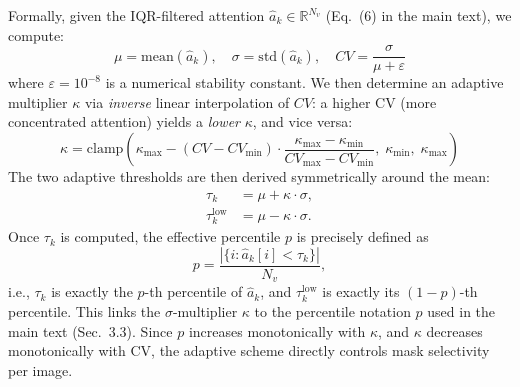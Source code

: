 Formally, given the IQR-filtered attention $\hat{a}_k \in \mathbb{R}^{N_v}$ (Eq.~(6) in the main text), we compute:
\begin{equation}
    \mu = \mathrm{mean}(\hat{a}_k),\quad
    \sigma = \mathrm{std}(\hat{a}_k),\quad
    \mathit{CV} = \frac{\sigma}{\mu + \varepsilon}
\end{equation}
where $\varepsilon = 10^{-8}$ is a numerical stability constant.
We then determine an adaptive multiplier $\kappa$ via \emph{inverse} linear interpolation of $\mathit{CV}$: a higher CV (more concentrated attention) yields a \emph{lower} $\kappa$, and vice versa:
\begin{equation}
    \kappa = \mathrm{clamp}\!\left(
        \kappa_{\max} - (\mathit{CV} - \mathit{CV}_{\min}) \cdot \frac{\kappa_{\max} - \kappa_{\min}}{\mathit{CV}_{\max} - \mathit{CV}_{\min}},\;
        \kappa_{\min},\; \kappa_{\max}
    \right)
\end{equation}
The two adaptive thresholds are then derived symmetrically around the mean:
\begin{equation}
\begin{aligned}
    \tau_k &= \mu + \kappa \cdot \sigma, \\
    \tau_k^{\mathrm{low}} &= \mu - \kappa \cdot \sigma.
\end{aligned}
\label{eq:adaptive_thresholds}
\end{equation}
Once $\tau_k$ is computed, the effective percentile $p$ is precisely defined as
\begin{equation}
    p = \frac{|\{i : \hat{a}_k[i] < \tau_k\}|}{N_v},
    \label{eq:effective_p}
\end{equation}
i.e., $\tau_k$ is exactly the $p$-th percentile of $\hat{a}_k$, and $\tau_k^{\mathrm{low}}$ is exactly its $(1{-}p)$-th percentile. This links the $\sigma$-multiplier $\kappa$ to the percentile notation $p$ used in the main text (Sec.~3.3).
Since $p$ increases monotonically with $\kappa$, and $\kappa$ decreases monotonically with CV, the adaptive scheme directly controls mask selectivity per image.

